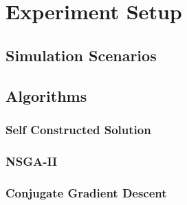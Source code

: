 \documentclass[./\jobname.tex]{subfiles}
\begin{document}
\chapter{Experiment Setup}

\section{Simulation Scenarios}

\section{Algorithms}

\subsection{Self Constructed Solution}

\subsection{NSGA-II}

\subsection{Conjugate Gradient Descent}
\end{document}
